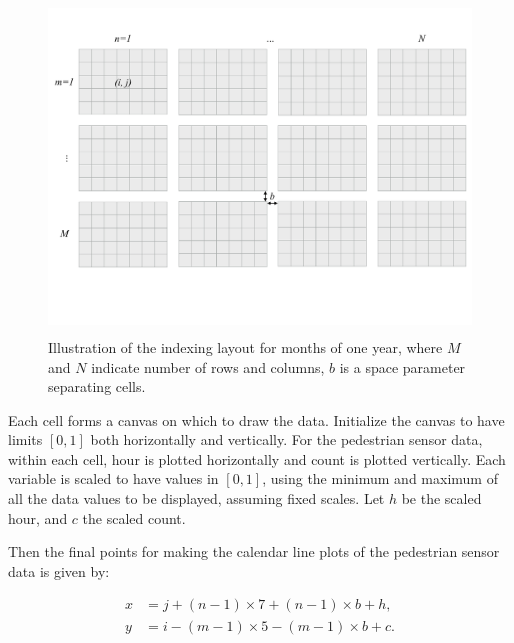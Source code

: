 \documentclass[article]{jss}
\theoremstyle{definition}
\theoremstyle{definition}
\theoremstyle{definition}
\theoremstyle{remark}
\begin{document}
\begin{CodeChunk}
\begin{figure}

{\centering \includegraphics[width=360pt,height=250pt]{figure/year-diagram} 

}

\caption[Illustration of the indexing layout for months of
one year, where \(M\) and \(N\) indicate number of rows and columns,
\(b\) is a space parameter separating cells.]{Illustration of the indexing layout for months of
one year, where \(M\) and \(N\) indicate number of rows and columns,
\(b\) is a space parameter separating cells.}\label{fig:year-diagram}
\end{figure}
\end{CodeChunk}





Each cell forms a canvas on which to draw the data. Initialize the
canvas to have limits \([0, 1]\) both horizontally and vertically. For
the pedestrian sensor data, within each cell, hour is plotted
horizontally and count is plotted vertically. Each variable is scaled to
have values in \([0,1]\), using the minimum and maximum of all the data
values to be displayed, assuming fixed scales. Let \(h\) be the scaled
hour, and \(c\) the scaled count.

Then the final points for making the calendar line plots of the
pedestrian sensor data is given by:

\begin{equation}
  \begin{aligned}
  x &= j + (n - 1) \times 7 + (n - 1) \times b + h, \\
  y &= i - (m - 1) \times 5 - (m - 1) \times b + c. \label{eq:final}
  \end{aligned}
\end{equation}
\end{document}
